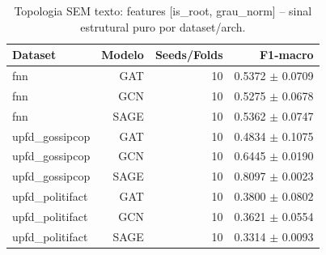 \begin{table}[H]\centering
\caption{Topologia SEM texto: features [is\_root, grau\_norm] -- sinal estrutural puro por dataset/arch.}
\label{tab:topologia_sem_texto}
\begin{tabular}{lrrr}
\toprule
Dataset & Modelo & Seeds/Folds & F1-macro \\
\midrule
fnn & GAT & 10 & 0.5372 $\pm$ 0.0709 \\
fnn & GCN & 10 & 0.5275 $\pm$ 0.0678 \\
fnn & SAGE & 10 & 0.5362 $\pm$ 0.0747 \\
upfd\_gossipcop & GAT & 10 & 0.4834 $\pm$ 0.1075 \\
upfd\_gossipcop & GCN & 10 & 0.6445 $\pm$ 0.0190 \\
upfd\_gossipcop & SAGE & 10 & 0.8097 $\pm$ 0.0023 \\
upfd\_politifact & GAT & 10 & 0.3800 $\pm$ 0.0802 \\
upfd\_politifact & GCN & 10 & 0.3621 $\pm$ 0.0554 \\
upfd\_politifact & SAGE & 10 & 0.3314 $\pm$ 0.0093 \\
\bottomrule
\end{tabular}
\end{table}